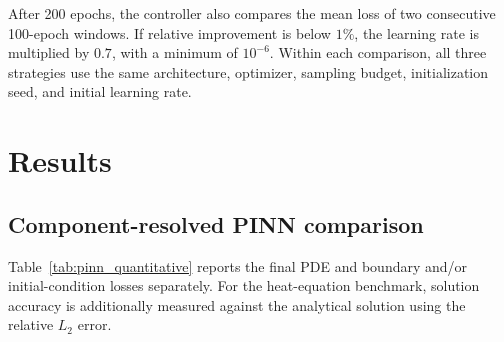 \documentclass{article}
\begin{document}
After 200 epochs, the controller also compares the mean loss of two consecutive 100-epoch windows. If relative improvement is below $1\%$, the learning rate is multiplied by $0.7$, with a minimum of $10^{-6}$. Within each comparison, all three strategies use the same architecture, optimizer, sampling budget, initialization seed, and initial learning rate.

\section{Results} 
\label{sec:results}

\subsection{Component-resolved PINN comparison}
Table~\ref{tab:pinn_quantitative} reports the final PDE and boundary and/or initial-condition losses separately. For the heat-equation benchmark, solution accuracy is additionally measured against the analytical solution using the relative $L_2$ error. %

\begin{table}[h!]
\centering
\small
\caption{Final PINN losses under matched settings. PDE and BC/IC losses are reported separately because the adaptive strategy changes their relative weighting during training. Relative $L_2$ error is available only for the heat-equation benchmark.}
\label{tab:pinn_quantitative}
\end{table}
\end{document}
